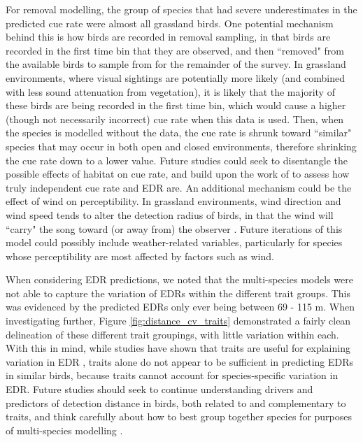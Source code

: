 \documentclass[12pt]{article}
\begin{document}
\par For removal modelling, the group of species that had severe underestimates in the predicted cue rate were almost all grassland birds.
One potential mechanism behind this is how birds are recorded in removal sampling, in that birds are recorded in the first time bin that they are observed, and then ``removed" from the available birds to sample from for the remainder of the survey.
In grassland environments, where visual sightings are potentially more likely (and combined with less sound attenuation from vegetation), it is likely that the majority of these birds are being recorded in the first time bin, which would cause a higher (though not necessarily incorrect) cue rate when this data is used.
Then, when the species is modelled without the data, the cue rate is shrunk toward ``similar" species that may occur in both open and closed environments, therefore shrinking the cue rate down to a lower value.
Future studies could seek to disentangle the possible effects of habitat on cue rate, and build upon the work of \citet{martin-schwarze_joint_2021} to assess how truly independent cue rate and EDR are.
An additional mechanism could be the effect of wind on perceptibility.
In grassland environments, wind direction and wind speed tends to alter the detection radius of birds, in that the wind will ``carry" the song toward (or away from) the observer \citep{rigby_factors_2019}.
Future iterations of this model could possibly include weather-related variables, particularly for species whose perceptibility are most affected by factors such as wind.

\par When considering EDR predictions, we noted that the multi-species models were not able to capture the variation of EDRs within the different trait groups.
This was evidenced by the predicted EDRs only ever being between 69 - 115 m.
When investigating further, Figure \ref{fig:distance_cv_traits} demonstrated a fairly clean delineation of these different trait groupings, with little variation within each.
With this in mind, while studies have shown that traits are useful for explaining variation in EDR \citep{solymos_phylogeny_2018, johnston_species_2014}, traits alone do not appear to be sufficient in predicting EDRs in similar birds, because traits cannot account for species-specific variation in EDR. 
Future studies should seek to continue understanding drivers and predictors of detection distance in birds, both related to and complementary to traits, and think carefully about how to best group together species for purposes of multi-species modelling \citep{pacifici_guidelines_2014}.
\end{document}
